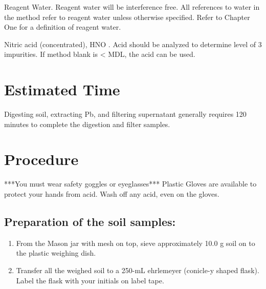 \documentclass[12pt]{../SOP3_alpha}
\begin{document}
\NP Reagent Water. Reagent water will be interference free. All references to water in
the method refer to reagent water unless otherwise specified. Refer to Chapter One for a definition
of reagent water.

\NP Nitric acid (concentrated), HNO . Acid should be analyzed to determine level of 3
impurities. If method blank is < MDL, the acid can be used. 


\section{Estimated Time}

\NP Digesting soil, extracting Pb, and filtering supernatant  generally requires 120 minutes to complete the digestion and filter samples.


\section{Procedure}


***You must wear safety goggles or eyeglasses***
Plastic Gloves are available to protect your hands from acid. Wash off any acid, even on the gloves.

\subsection {Preparation of the soil samples:}
  \begin{enumerate}
    \item From the Mason jar with mesh on top, sieve approximately 10.0 g soil on to the plastic weighing dish.
    \item Transfer all the weighed soil to a 250-mL ehrlemeyer (conicle-y shaped flask). Label the flask with your initials on label tape. 
  \end{enumerate}
\end{document}
